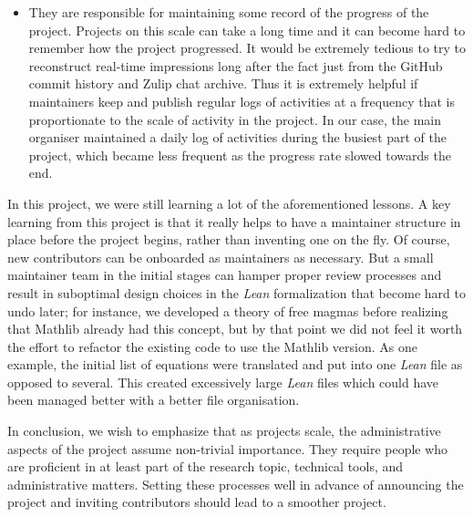 \begin{itemize}
    \item They are responsible for maintaining some record of the progress of the project. Projects on this scale can take a long time and it can become hard to remember how the project progressed. It would be extremely tedious to try to reconstruct real-time impressions long after the fact just from the GitHub commit history and Zulip chat archive. Thus it is extremely helpful if maintainers keep and publish regular logs of activities at a frequency that is proportionate to the scale of activity in the project.  In our case, the main organiser maintained a daily log of activities during the busiest part of the project, which became less frequent as the progress rate slowed towards the end.
\end{itemize}

In this project, we were still learning a lot of the aforementioned lessons. A key learning from this project is that it really helps to have a maintainer structure in place before the project begins, rather than inventing one on the fly. Of course, new contributors can be onboarded as maintainers as necessary. But a small maintainer team in the initial stages can hamper proper review processes and result in suboptimal design choices in the  \emph{Lean} formalization that become hard to undo later; for instance, we developed a theory of free magmas before realizing that Mathlib already had this concept, but by that point we did not feel it worth the effort to refactor the existing code to use the Mathlib version. As one example, the initial list of equations were translated and put into one  \emph{Lean} file as opposed to several. This created excessively large  \emph{Lean} files which could have been managed better with a better file organisation.

In conclusion, we wish to emphasize that as projects scale, the administrative aspects of the project assume non-trivial importance. They require people who are proficient in at least part of the research topic, technical tools, and administrative matters. Setting these processes well in advance of announcing the project and inviting contributors should lead to a smoother project.
